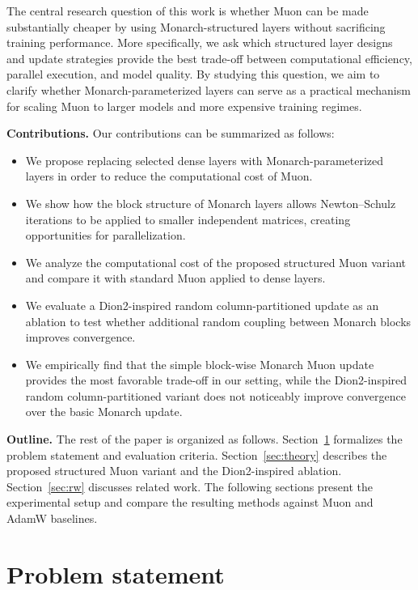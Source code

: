 \documentclass{article}
\begin{document}
The central research question of this work is whether Muon can be made substantially cheaper by using Monarch-structured layers without sacrificing training performance. More specifically, we ask which structured layer designs and update strategies provide the best trade-off between computational efficiency, parallel execution, and model quality. By studying this question, we aim to clarify whether Monarch-parameterized layers can serve as a practical mechanism for scaling Muon to larger models and more expensive training regimes.

\textbf{Contributions.} Our contributions can be summarized as follows:
\begin{itemize}
    \item We propose replacing selected dense layers with Monarch-parameterized layers in order to reduce the computational cost of Muon.
    \item We show how the block structure of Monarch layers allows Newton--Schulz iterations to be applied to smaller independent matrices, creating opportunities for parallelization.
    \item We analyze the computational cost of the proposed structured Muon variant and compare it with standard Muon applied to dense layers.
    \item We evaluate a Dion2-inspired random column-partitioned update as an ablation to test whether additional random coupling between Monarch blocks improves convergence.
    \item We empirically find that the simple block-wise Monarch Muon update provides the most favorable trade-off in our setting, while the Dion2-inspired random column-partitioned variant does not noticeably improve convergence over the basic Monarch update.
\end{itemize}

\textbf{Outline.} The rest of the paper is organized as follows. Section~\ref{sec:ps} formalizes the problem statement and evaluation criteria. Section~\ref{sec:theory} describes the proposed structured Muon variant and the Dion2-inspired ablation. Section~\ref{sec:rw} discusses related work. The following sections present the experimental setup and compare the resulting methods against Muon and AdamW baselines.

\section{Problem statement}\label{sec:ps}
\end{document}

